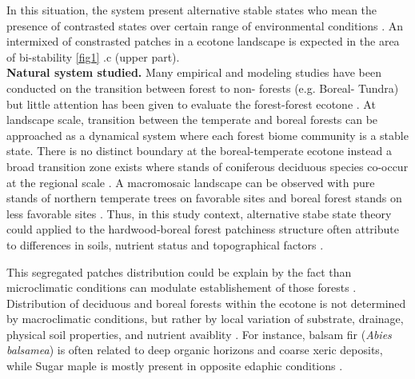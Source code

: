 In this situation, the system present alternative stable states who mean the
presence of contrasted states over certain range of environmental conditions
\cite{scheffer2009critical}. An intermixed of constrasted patches in a ecotone
landscape is expected in the area of bi-stability \ref{fig1} .c (upper part).\\


\textbf{Natural system studied.} Many empirical and modeling studies have been
conducted on the transition between forest to non- forests (e.g. Boreal-
Tundra) \cite{Scheffer2012,Scheffer2001,Hirota2011,Messaoud2007} but little
attention has been given to evaluate the forest-forest ecotone
\cite{Goldblum2010,Graignic2013,Messaoud2007}. At landscape scale, transition
between  the temperate and boreal forests can be approached as a dynamical
system where each forest biome community is a stable state. There is no
distinct boundary at the boreal-temperate ecotone instead a broad transition
zone exists where stands of coniferous deciduous species co-occur at the
regional scale \cite{Goldblum2010}. A macromosaic landscape can be observed
with pure stands of northern temperate trees on favorable sites and boreal
forest stands on less favorable sites \cite{Goldblum2010,Fisichelli2013}.
Thus, in this study context, alternative stabe state theory could applied to the
hardwood-boreal forest patchiness structure often attribute to differences in
soils, nutrient status and topographical factors \cite{Society2014}.


This segregated patches distribution could be explain by
the fact than microclimatic conditions can modulate establishement of those
forests \cite{DeFrenne2013}. Distribution of deciduous and boreal forests
within the ecotone is not determined by macroclimatic conditions, but rather
by local variation of substrate, drainage, physical soil properties, and
nutrient avaiblity \cite{Goldblum2010,Society2014}.  For instance, balsam fir
(\textit{Abies balsamea}) is often related to deep organic horizons and
coarse xeric deposits, while Sugar maple is mostly present in opposite edaphic
conditions \cite{Messaoud2007,Kellman2004,Barras1998}.

